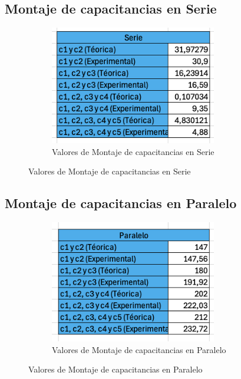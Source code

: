 \subsection{Montaje de capacitancias en Serie}

\begin{figure}[H]
    \centering
    \begin{subfigure}[b]{\textwidth}
        \centering
        \includegraphics[width=0.8\textwidth]{Figures/1. Content/MontajeCapacitanciasSerie.png}
        \caption{Valores de Montaje de capacitancias en Serie}
        \label{fig: Montaje de capacitancias en Serie}
    \end{subfigure}
    \hfill
\end{figure}

\subsection{Montaje de capacitancias en Paralelo}

\begin{figure}[H]
    \centering
    \begin{subfigure}[b]{\textwidth}
        \centering
        \includegraphics[width=0.8\textwidth]{Figures/1. Content/MontajeCapacitanciasParalelo.png}
        \caption{Valores de Montaje de capacitancias en Paralelo}
        \label{fig: Montaje de capacitancias en Paralelo}
    \end{subfigure}
    \hfill
\end{figure}



